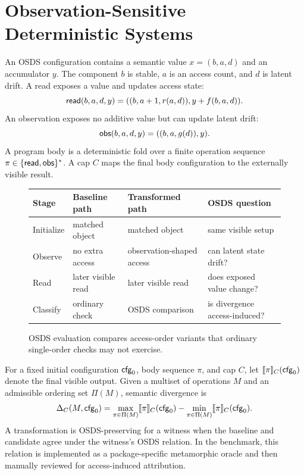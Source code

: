 \section{Observation-Sensitive Deterministic Systems}

An OSDS configuration contains a semantic value $x=(b,a,d)$ and an accumulator $y$. The component $b$ is stable, $a$ is an access count, and $d$ is latent drift. A read exposes a value and updates access state:
\[
\mathsf{read}(b,a,d,y)=((b,a+1,r(a,d)), y+f(b,a,d)).
\]
An observation exposes no additive value but can update latent drift:
\[
\mathsf{obs}(b,a,d,y)=((b,a,g(d)), y).
\]
A program body is a deterministic fold over a finite operation sequence $\pi\in\{\mathsf{read},\mathsf{obs}\}^*$. A cap $C$ maps the final body configuration to the externally visible result.

\begin{figure}[t]
\centering
\small
\begin{tabular}{llll}
\toprule
Stage & Baseline path & Transformed path & OSDS question \\
\midrule
Initialize & matched object & matched object & same visible setup \\
Observe & no extra access & observation-shaped access & can latent state drift? \\
Read & later visible read & later visible read & does exposed value change? \\
Classify & ordinary check & OSDS comparison & is divergence access-induced? \\
\bottomrule
\end{tabular}
\caption{OSDS evaluation compares access-order variants that ordinary single-order checks may not exercise.}
\label{fig:osds-model}
\end{figure}

For a fixed initial configuration $\mathsf{cfg}_0$, body sequence $\pi$, and cap $C$, let $\lbrack\!\lbrack \pi \rbrack\!\rbrack_C(\mathsf{cfg}_0)$ denote the final visible output. Given a multiset of operations $M$ and an admissible ordering set $\Pi(M)$, semantic divergence is
\[
\Delta_C(M,\mathsf{cfg}_0)=\max_{\pi\in\Pi(M)}\lbrack\!\lbrack \pi \rbrack\!\rbrack_C(\mathsf{cfg}_0)-\min_{\pi\in\Pi(M)}\lbrack\!\lbrack \pi \rbrack\!\rbrack_C(\mathsf{cfg}_0).
\]
A transformation is OSDS-preserving for a witness when the baseline and candidate agree under the witness's OSDS relation. In the benchmark, this relation is implemented as a package-specific metamorphic oracle and then manually reviewed for access-induced attribution.

